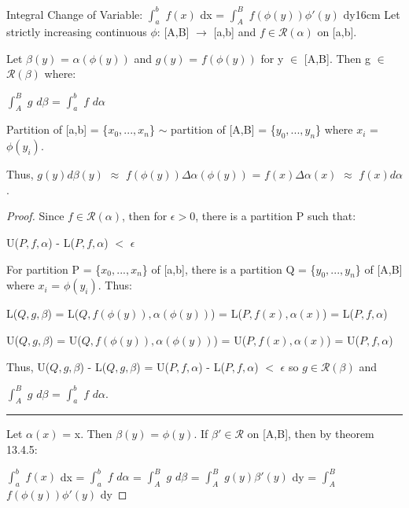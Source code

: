     \newpage



    \begin{wtheorem}{Integral Change of Variable:
    $\int_a^b$ $f(x)$ dx = $\int_A^B$ $f(\phi(y)) \phi'(y)$ dy}{16cm}
        Let strictly increasing continuous $\phi$:
        [A,B] $\rightarrow$ [a,b] and $f \in \mathscr{R}(\alpha)$ on [a,b].

        Let $\beta(y)$ = $\alpha(\phi(y))$ and
        $g(y)$ = $f(\phi(y))$ for y $\in$ [A,B].
        Then g $\in$ $\mathscr{R}(\beta)$ where:

        \hspace{0.5cm}
        $\int_A^B$ $g$ $d\beta$ = $\int_a^b$ $f$ $d\alpha$
    \end{wtheorem}

    \begin{intuition}
        Partition of [a,b] = \{$x_0,...,x_n$\}
        $\sim$
        partition of [A,B] = \{$y_0,...,y_n$\} where $x_i$ = $\phi(y_i)$.

        Thus,
        $g(y) d\beta(y)$
        $\approx$ $f(\phi(y)) \Delta \alpha(\phi(y))$
        = $f(x) \Delta \alpha(x)$
        $\approx$ $f(x) d\alpha$.
    \end{intuition}

    \vspace{0.1cm}

    \begin{proof}
        Since $f \in \mathscr{R}(\alpha)$, then for $\epsilon > 0$, there
        is a partition P such that:

        \hspace{0.5cm}
        U($P,f,\alpha$) - L($P,f,\alpha$) $<$ $\epsilon$

        For partition P = \{$x_0,...,x_n$\} of [a,b], there is a partition Q
        = \{$y_0,...,y_n$\} of [A,B] where $x_i$ = $\phi(y_i)$. Thus:

        \hspace{0.5cm}
        L($Q,g,\beta$)
        = L($Q,f(\phi(y)),\alpha(\phi(y))$)
        = L($P,f(x),\alpha(x)$)
        = L($P,f,\alpha$)

        \hspace{0.5cm}
        U($Q,g,\beta$)
        = U($Q,f(\phi(y)),\alpha(\phi(y))$)
        = U($P,f(x),\alpha(x)$)
        = U($P,f,\alpha$)

        Thus, U($Q,g,\beta$) - L($Q,g,\beta$)
        = U($P,f,\alpha$) - L($P,f,\alpha$) $<$ $\epsilon$
        so $g \in \mathscr{R}(\beta)$ and

        $\int_A^B$ $g$ $d\beta$ = $\int_a^b$ $f$ $d\alpha$.

        \rule[0.1cm]{15cm}{0.01cm}

        Let $\alpha(x)$ = x. Then $\beta(y)$ = $\phi(y)$.
        If $\beta' \in \mathscr{R}$ on [A,B], then by {\color{red} theorem 13.4.5}:

        \hspace{0.5cm}
        $\int_a^b$ $f(x)$ dx
        = $\int_a^b$ $f$ $d\alpha$
        = $\int_A^B$ $g$ $d\beta$
        = $\int_A^B$ $g(y) \beta'(y)$ dy
        = $\int_A^B$ $f(\phi(y)) \phi'(y)$ dy    
    \end{proof}

